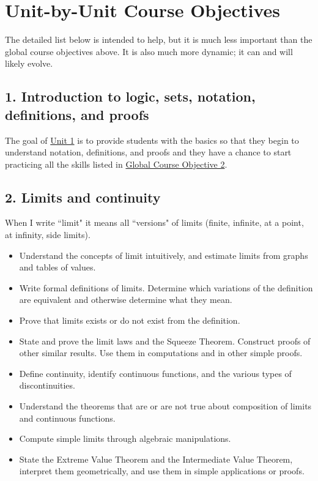 \documentclass[11pt]{article}
\newcommand{\vv}{\vspace{.5cm}}
\begin{document}
\newpage
\section{Unit-by-Unit Course Objectives}\label{Appendix}

\vv

\begin{warning}
The detailed list below is intended to help, but it is much less important than the global course objectives above.  It is also much more dynamic; it can and will likely evolve.
\end{warning}

\setcounter{subsection}{0}

\subsection{1. Introduction to logic, sets, notation, definitions, and proofs} \label{unit1}

The goal of \hyperref[unit1]{Unit 1} is to provide students with the basics so that they begin to understand notation, definitions, and proofs and they have a chance to start practicing all the skills listed in \hyperref[CO2]{Global Course Objective 2}.

\subsection{2. Limits and continuity} \label{unit2}

When I write ``limit" it means all ``versions" of limits (finite, infinite, at a point, at infinity, side limits).

	\begin{itemize}
		\item  Understand the concepts of limit intuitively, and estimate limits from graphs and tables of values.
		\item  Write formal definitions of limits.  Determine which variations of the definition are equivalent and otherwise determine what they mean.
		\item Prove that limits exists or do not exist from the definition.
		\item  State and prove the limit laws and the Squeeze Theorem.  Construct proofs of other similar results.  Use them in computations and in other simple proofs.
		\item Define continuity, identify continuous functions, and the various types of discontinuities.
		\item Understand the theorems that are or are not true about composition of limits and continuous functions.
		\item Compute simple limits through algebraic manipulations.
		\item State the Extreme Value Theorem and the Intermediate Value Theorem, interpret them geometrically, and use them in simple applications or proofs.
	\end{itemize}
\end{document}
